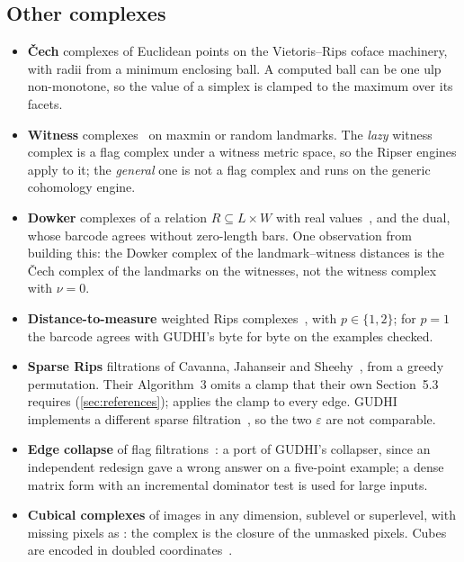 \subsection{Other complexes}\label{sec:complexes}

\begin{itemize}[leftmargin=1.5em, itemsep=2pt]
\item \textbf{\v{C}ech} complexes of Euclidean points on the Vietoris--Rips coface machinery, with radii from a minimum
  enclosing ball. A computed ball can be one ulp non-monotone, so the value of a simplex is clamped to the maximum over its
  facets.
\item \textbf{Witness} complexes~\cite{desilva2004witness} on maxmin or random landmarks. The \emph{lazy} witness complex is a flag complex under a
  witness metric space, so the Ripser engines apply to it; the \emph{general} one is not a flag complex and runs on the
  generic cohomology engine.
\item \textbf{Dowker} complexes of a relation $R\subseteq L\times W$ with real values~\cite{dowker1952homology,chowdhury2018dowker}, and the
  dual, whose barcode agrees without zero-length bars. One observation from building this: the Dowker complex of the
  landmark--witness distances is the \v{C}ech complex of the landmarks on the witnesses, not the witness complex with $\nu=0$.
\item \textbf{Distance-to-measure} weighted Rips complexes~\cite{anai2019dtm,chazal2011geometric}, with $p\in\{1,2\}$; for
  $p=1$ the barcode agrees with GUDHI's  byte for byte on the examples checked.
\item \textbf{Sparse Rips} filtrations of Cavanna, Jahanseir and Sheehy~\cite{cavanna2015sparse}, from a greedy permutation. Their
  Algorithm~3 omits a clamp that their own Section~5.3 requires (\cref{sec:references}); \tdaj{} applies the clamp to every edge.
  GUDHI implements a different sparse filtration~\cite{buchet2016efficient}, so the two $\varepsilon$ are not comparable.
\item \textbf{Edge collapse} of flag filtrations~\cite{boissonnat2020edge,glisse2022swap}: a port of GUDHI's collapser, since an independent
  redesign gave a wrong answer on a five-point example; a dense matrix form with an incremental dominator test is used for large inputs.
\item \textbf{Cubical complexes} of images in any dimension, sublevel or superlevel, with missing pixels as : the
  complex is the closure of the unmasked pixels. Cubes are encoded in doubled coordinates~\cite{kaczynski2004computational}.
\end{itemize}

